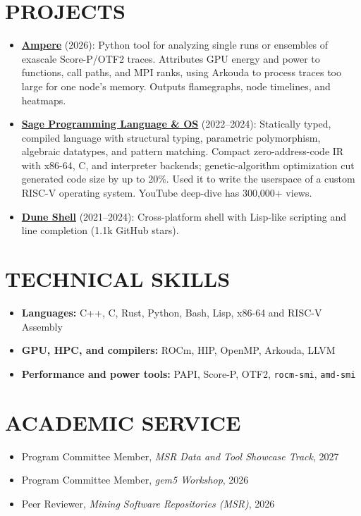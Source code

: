 \documentclass[paper=letter,fontsize=11pt]{scrartcl} %
\newcommand{\NewPart}[1]{\vspace{-0.35em}\section*{\uppercase{#1}}\vspace{-0.35em}}
\begin{document}
\NewPart{Projects}
\begin{itemize}[itemsep=3pt]
\item \href{https://github.com/adam-mcdaniel/ampere}{\textbf{Ampere}} (2026): Python tool for analyzing single runs or ensembles of exascale Score-P/OTF2 traces. Attributes GPU energy and power to functions, call paths, and MPI ranks, using Arkouda to process traces too large for one node's memory. Outputs flamegraphs, node timelines, and heatmaps.
\item \href{https://github.com/adam-mcdaniel/sage}{\textbf{Sage Programming Language \& OS}} (2022--2024): Statically typed, compiled language with structural typing, parametric polymorphism, algebraic datatypes, and pattern matching. Compact zero-address-code IR with x86-64, C, and interpreter backends; genetic-algorithm optimization cut generated code size by up to 20\%. Used it to write the userspace of a custom RISC-V operating system. YouTube deep-dive has 300,000+ views.
\item \href{https://github.com/adam-mcdaniel/dune}{\textbf{Dune Shell}} (2021--2024): Cross-platform shell with Lisp-like scripting and line completion (1.1k GitHub stars).
\end{itemize}

\NewPart{Technical Skills}
\begin{itemize}
\item \textbf{Languages:} C++, C, Rust, Python, Bash, Lisp, x86-64 and RISC-V Assembly
\item \textbf{GPU, HPC, and compilers:} ROCm, HIP, OpenMP, Arkouda, LLVM
\item \textbf{Performance and power tools:} PAPI, Score-P, OTF2, \texttt{rocm-smi}, \texttt{amd-smi}
\end{itemize}

\NewPart{Academic Service}
\begin{itemize}
\item Program Committee Member, \textit{MSR Data and Tool Showcase Track}, 2027
\item Program Committee Member, \textit{gem5 Workshop}, 2026
\item Peer Reviewer, \textit{Mining Software Repositories (MSR)}, 2026
\end{itemize}
\end{document}
